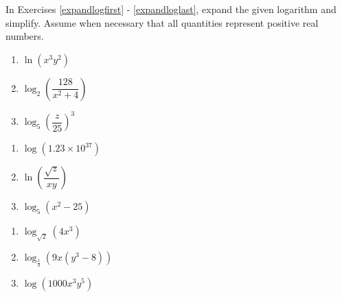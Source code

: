 \documentclass{ximera}
\begin{document}
	\author{Stitz-Zeager}



\label{ExercisesforPropertiesofLogarithms}

In Exercises \ref{expandlogfirst} - \ref{expandloglast}, expand the given logarithm and simplify.  Assume when necessary that all quantities represent positive real numbers.

\begin{multicols}{3}
\begin{enumerate}

\item $\ln(x^{3}y^{2})$  \label{expandlogfirst}
\item $\log_{2}\left(\dfrac{128}{x^{2} + 4}\right)$
\item $\log_{5}\left(\dfrac{z}{25}\right)^{3}$ 

\setcounter{HW}{\value{enumi}}
\end{enumerate}
\end{multicols}

\begin{multicols}{3}
\begin{enumerate}
\setcounter{enumi}{\value{HW}}

\item $\log(1.23 \times 10^{37})$ 
\item $\ln\left(\dfrac{\sqrt{z}}{xy}\right)$
\item $\log_{5} \left(x^2 - 25 \right)$ 

\setcounter{HW}{\value{enumi}}
\end{enumerate}
\end{multicols}

\begin{multicols}{3}
\begin{enumerate}
\setcounter{enumi}{\value{HW}}

\item $\log_{\sqrt{2}} \left(4x^3\right)$
\item $\log_{\frac{1}{3}}(9x(y^{3} - 8))$
\item $\log\left(1000x^3y^5\right)$

\setcounter{HW}{\value{enumi}}
\end{enumerate}
\end{multicols}
\end{document}
